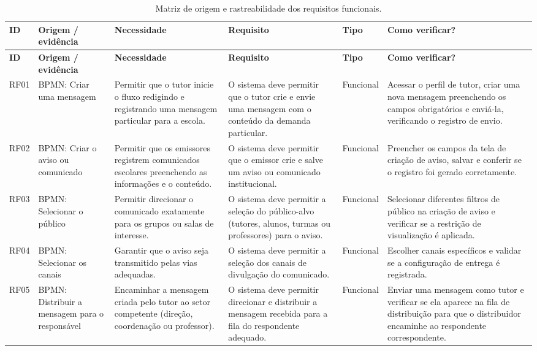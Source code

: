 \documentclass[a4paper,12pt]{report}
\begin{document}
\begin{longtable}{|p{1.1cm}|p{2.5cm}|p{2.8cm}|p{3.4cm}|p{1.6cm}|p{3.0cm}|}
\caption{Matriz de origem e rastreabilidade dos requisitos funcionais.} \label{tab:requisitos-funcionais} \\
\hline
\textbf{ID} & \textbf{Origem / evidência} & \textbf{Necessidade} & \textbf{Requisito} & \textbf{Tipo} & \textbf{Como verificar?} \\
\hline
\endfirsthead
\hline
\textbf{ID} & \textbf{Origem / evidência} & \textbf{Necessidade} & \textbf{Requisito} & \textbf{Tipo} & \textbf{Como verificar?} \\
\hline
\endhead
RF01 & BPMN: Criar uma mensagem & Permitir que o tutor inicie o fluxo redigindo e registrando uma mensagem particular para a escola. & O sistema deve permitir que o tutor crie e envie uma mensagem com o conteúdo da demanda particular. & Funcional & Acessar o perfil de tutor, criar uma nova mensagem preenchendo os campos obrigatórios e enviá-la, verificando o registro de envio. \\
\hline
RF02 & BPMN: Criar o aviso ou comunicado & Permitir que os emissores registrem comunicados escolares preenchendo as informações e o conteúdo. & O sistema deve permitir que o emissor crie e salve um aviso ou comunicado institucional. & Funcional & Preencher os campos da tela de criação de aviso, salvar e conferir se o registro foi gerado corretamente. \\
\hline
RF03 & BPMN: Selecionar o público & Permitir direcionar o comunicado exatamente para os grupos ou salas de interesse. & O sistema deve permitir a seleção do público-alvo (tutores, alunos, turmas ou professores) para o aviso. & Funcional & Selecionar diferentes filtros de público na criação de aviso e verificar se a restrição de visualização é aplicada. \\
\hline
RF04 & BPMN: Selecionar os canais & Garantir que o aviso seja transmitido pelas vias adequadas. & O sistema deve permitir a seleção dos canais de divulgação do comunicado. & Funcional & Escolher canais específicos e validar se a configuração de entrega é registrada. \\
\hline
RF05 & BPMN: Distribuir a mensagem para o responsável & Encaminhar a mensagem criada pelo tutor ao setor competente (direção, coordenação ou professor). & O sistema deve permitir direcionar e distribuir a mensagem recebida para a fila do respondente adequado. & Funcional & Enviar uma mensagem como tutor e verificar se ela aparece na fila de distribuição para que o distribuidor encaminhe ao respondente correspondente. \\

\end{longtable}
\end{document}
